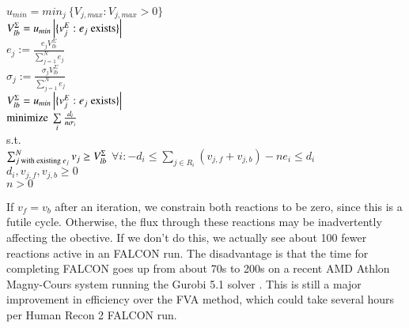 \begin{AlgFloat}[H]
\begin{Algorithm}[FALCON]
\label{alg:FALCON}
\begin{algorithmic}
~\\
$u_{min} = min_j\ \{V_{j,max} : V_{j,max} > 0\}$\\
$V_{lb}^{\Sigma} = u_{min} \left|\{v_j^E : e_j \textnormal{ exists}\}\right|$\\
  \STATE $e_j := \frac{e_j V_{lb}^{\Sigma}}
    {\sum\nolimits_{j=1}^N e_j}$\\ 
  \STATE $\sigma_j := \frac{\sigma_j V_{lb}^{\Sigma}}
    {\sum\nolimits_{j=1}^N e_j}$\\ 
\ENDFOR
{}
  \STATE $V_{lb}^{\Sigma} = u_{min} \left|\{v_j^E : 
    e_j \textnormal{ exists}\}\right|$\\
  \INDSTATE $\textnormal{minimize}\ \sum\limits_i \frac{d_i}{n
    \sigma_i}$ \\
  \INDSTATE s.t. \\
  \INDSTATE $\sum_{j \textnormal{ with existing\ } e_j}^N v_j \geq V_{lb}^{\Sigma}$ 
  \INDSTATE $\forall i: -d_i \leq \sum\nolimits_{j \in R_i} (v_{j,f} +
    v_{j,b}) - n e_i \leq d_i$ \\
  \INDSTATE $d_i, v_{j,f}, v_{j,b} \geq 0$ \\
  \INDSTATE $n > 0$
  \ENDFOR
\ENDWHILE
\end{algorithmic}
\end{Algorithm}
\end{AlgFloat}


If $v_f = v_b$ after an iteration, we constrain both reactions to be
zero, since this is a futile cycle. Otherwise, the flux through these
reactions may be inadvertently affecting the obective. If we don't do
this, we actually see about 100 fewer reactions active in an FALCON
run.  The disadvantage is that the time for completing FALCON goes up
from about 70s to 200s on a recent AMD Athlon Magny-Cours system
running the Gurobi 5.1 solver \citep{gurobi}. This is still a major
improvement in efficiency over the FVA method, which could take
several hours per Human Recon 2 FALCON run.

